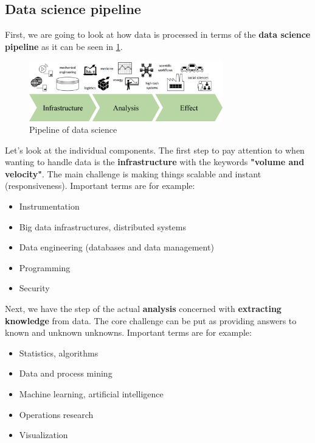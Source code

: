 \subsection{Data science pipeline}
First, we are going to look at how data is processed in terms of the \textbf{data science pipeline} as it can be seen in \ref{fig:1_pipeline}. 

\begin{figure}[h]
  \centering
  \includegraphics[width=0.75\textwidth]{assets/basics/pipeline.png}
  \caption{Pipeline of data science}
  \label{fig:1_pipeline}
\end{figure}

Let's look at the individual components. The first step to pay attention to when wanting to handle data is the \textbf{infrastructure} with the keywords \textbf{"volume and velocity"}. The main challenge is making things scalable and instant (responsiveness). Important terms are for example:
\begin{itemize}
  \item Instrumentation
  \item Big data infrastructures, distributed systems
  \item Data engineering (databases and data management)
  \item Programming
  \item Security
\end{itemize}

Next, we have the step of the actual \textbf{analysis} concerned with \textbf{extracting knowledge} from data. The core challenge can be put as providing answers to known and unknown unknowns. Important terms are for example:
\begin{itemize}
  \item Statistics, algorithms
  \item Data and process mining
  \item Machine learning, artificial intelligence
  \item Operations research
  \item Visualization
\end{itemize}

